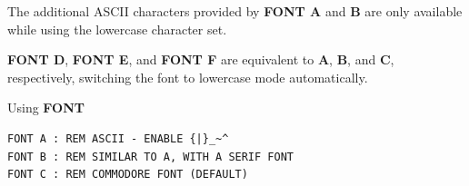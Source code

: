 \begin{description}[leftmargin=2cm,style=nextline]
\item [Remarks:]  The additional ASCII characters provided by {\bf FONT A} and {\bf B} are only available while using the lowercase character set.

                  {\bf FONT D}, {\bf FONT E}, and {\bf FONT F} are equivalent to {\bf A}, {\bf B}, and {\bf C}, respectively, switching the font to lowercase mode automatically.

\item [Examples:] Using {\bf FONT}

\begin{tcolorbox}[colback=black,coltext=white]
\begin{verbatim}
FONT A : REM ASCII - ENABLE {|}_~^
FONT B : REM SIMILAR TO A, WITH A SERIF FONT
FONT C : REM COMMODORE FONT (DEFAULT)
\end{verbatim}
\end{tcolorbox}
\end{description}


\newpage
